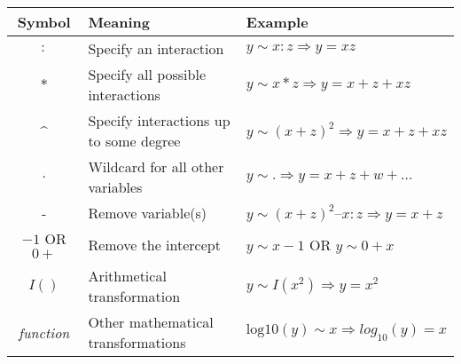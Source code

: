 \begin{tabular}{c*{2}{l}}
\toprule
Symbol & Meaning & Example \\
\midrule
$:$ & Specify an interaction & $y \sim x:z \Rightarrow y = xz$\\
$*$ & Specify all possible interactions & $y \sim x*z \Rightarrow y = x + z + xz$\\
\textasciicircum & Specify interactions up to some degree & $y \sim (x + z)^2 \Rightarrow y = x + z + xz$\\
$.$ & Wildcard for all other variables & $y \sim . \Rightarrow y = x + z + w + \dots$\\
- & Remove variable(s) & $y \sim (x + z)^2 – x:z \Rightarrow y = x + z$\\
$-1$ OR $0 + $ & Remove the intercept & $y \sim x - 1$ OR $y \sim 0 + x$\\
$I()$ & Arithmetical transformation & $y \sim I(x^2) \Rightarrow y = x^2$\\
\textit{function} & Other mathematical transformations & $\text{log10}(y) \sim x \Rightarrow log_{10}(y) = x$\\
\end{tabular}
